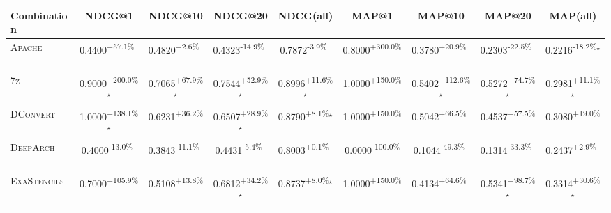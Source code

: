 \begin{table}[htbp]
\centering
\renewcommand{\arraystretch}{1.2}
\begin{tabular}{l|cccc|cccc}
\hline
Combination & NDCG@1 & NDCG@10 & NDCG@20 & NDCG(all) & MAP@1 & MAP@10 & MAP@20 & MAP(all) \\ \hline
\textsc{Apache} & \cellcolor{green!30}0.4400\textsuperscript{+57.1\%}$^{\,\,\,}$ & \cellcolor{green!30}0.4820\textsuperscript{+2.6\%}$^{\,\,\,}$ & \cellcolor{red!30}0.4323\textsuperscript{-14.9\%}$^{\,\,\,}$ & \cellcolor{red!30}0.7872\textsuperscript{-3.9\%}$^{\,\,\,}$ & \cellcolor{green!30}0.8000\textsuperscript{+300.0\%}$^{\,\,\,}$ & \cellcolor{green!30}0.3780\textsuperscript{+20.9\%}$^{\,\,\,}$ & \cellcolor{red!30}0.2303\textsuperscript{-22.5\%}$^{\,\,\,}$ & \cellcolor{red!30}0.2216\textsuperscript{-18.2\%}$^\star$ \\
\textsc{7z} & \cellcolor{green!30}0.9000\textsuperscript{+200.0\%}$^\star$ & \cellcolor{green!30}0.7065\textsuperscript{+67.9\%}$^\star$ & \cellcolor{green!30}0.7544\textsuperscript{+52.9\%}$^\star$ & \cellcolor{green!30}0.8996\textsuperscript{+11.6\%}$^\star$ & \cellcolor{green!30}1.0000\textsuperscript{+150.0\%}$^{\,\,\,}$ & \cellcolor{green!30}0.5402\textsuperscript{+112.6\%}$^\star$ & \cellcolor{green!30}0.5272\textsuperscript{+74.7\%}$^\star$ & \cellcolor{green!30}0.2981\textsuperscript{+11.1\%}$^\star$ \\
\textsc{DConvert} & \cellcolor{green!30}1.0000\textsuperscript{+138.1\%}$^\star$ & \cellcolor{green!30}0.6231\textsuperscript{+36.2\%}$^{\,\,\,}$ & \cellcolor{green!30}0.6507\textsuperscript{+28.9\%}$^\star$ & \cellcolor{green!30}0.8790\textsuperscript{+8.1\%}$^\star$ & \cellcolor{green!30}1.0000\textsuperscript{+150.0\%}$^{\,\,\,}$ & \cellcolor{green!30}0.5042\textsuperscript{+66.5\%}$^{\,\,\,}$ & \cellcolor{green!30}0.4537\textsuperscript{+57.5\%}$^{\,\,\,}$ & \cellcolor{green!30}0.3080\textsuperscript{+19.0\%}$^{\,\,\,}$ \\
\textsc{DeepArch} & \cellcolor{red!30}0.4000\textsuperscript{-13.0\%}$^{\,\,\,}$ & \cellcolor{red!30}0.3843\textsuperscript{-11.1\%}$^{\,\,\,}$ & \cellcolor{red!30}0.4431\textsuperscript{-5.4\%}$^{\,\,\,}$ & \cellcolor{green!30}0.8003\textsuperscript{+0.1\%}$^{\,\,\,}$ & \cellcolor{red!30}0.0000\textsuperscript{-100.0\%}$^{\,\,\,}$ & \cellcolor{red!30}0.1044\textsuperscript{-49.3\%}$^{\,\,\,}$ & \cellcolor{red!30}0.1314\textsuperscript{-33.3\%}$^{\,\,\,}$ & \cellcolor{green!30}0.2437\textsuperscript{+2.9\%}$^{\,\,\,}$ \\
\textsc{ExaStencils} & \cellcolor{green!30}0.7000\textsuperscript{+105.9\%}$^{\,\,\,}$ & \cellcolor{green!30}0.5108\textsuperscript{+13.8\%}$^{\,\,\,}$ & \cellcolor{green!30}0.6812\textsuperscript{+34.2\%}$^\star$ & \cellcolor{green!30}0.8737\textsuperscript{+8.0\%}$^\star$ & \cellcolor{green!30}1.0000\textsuperscript{+150.0\%}$^{\,\,\,}$ & \cellcolor{green!30}0.4134\textsuperscript{+64.6\%}$^{\,\,\,}$ & \cellcolor{green!30}0.5341\textsuperscript{+98.7\%}$^\star$ & \cellcolor{green!30}0.3314\textsuperscript{+30.6\%}$^\star$ \\

\end{tabular}
\end{table}
